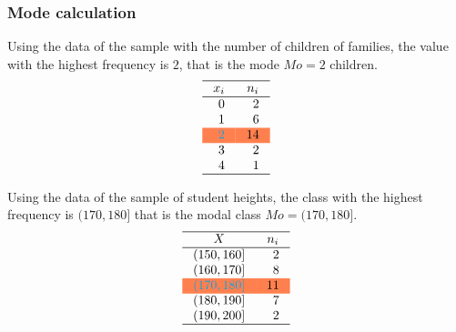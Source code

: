 \begin{frame}
\frametitle{Mode calculation}
Using the data of the sample with the number of children of families, the value with the highest frequency is $2$, that
is the mode $Mo = 2$ children.
\[
\setlength\arraycolsep{3mm}
\setlength\arrayrulewidth{0.5pt}
\begin{array}{rr}
\hline
\multicolumn{1}{c}{x_i} & \multicolumn{1}{c}{n_i} \\
\hline
0 & 2 \\
1 & 6 \\
\rowcolor{coral}\color{color1} 2 & 14 \\
3 & 2  \\
4 & 1 \\
\hline
\end{array}
\]

Using the data of the sample of student heights, the class with the highest frequency is $(170,180]$ that is the modal
class $Mo=(170,180]$.
\[
\setlength\arraycolsep{3mm}
\setlength\arrayrulewidth{0.5pt}
\begin{array}{rr}
\hline
\multicolumn{1}{c}{X} & \multicolumn{1}{c}{n_i} \\
\hline
(150,160] & 2 \\
(160,170] & 8 \\
\rowcolor{coral} \color{color1}(170,180] & 11 \\
(180,190] & 7 \\
(190,200] & 2 \\
\hline
\end{array}
\]
\end{frame}


